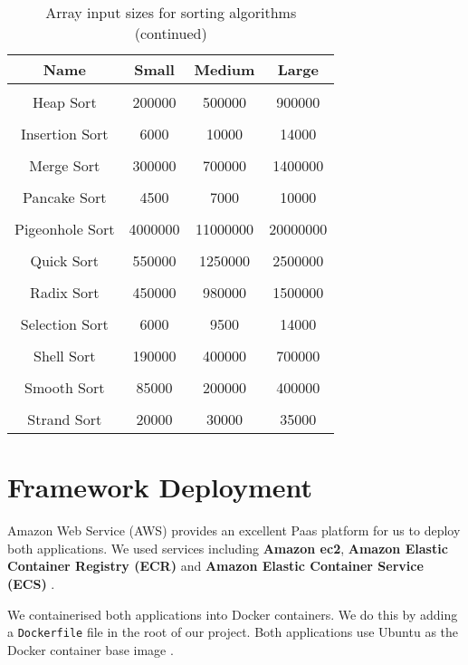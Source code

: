 \begin{table}[h!]
\centering
\begin{tabular}{||c c c c||} 
\hline
Name & Small & Medium & Large \\ [1ex] 
\hline\hline
 & & & \\
Heap Sort & 200000 & 500000 & 900000 \\ 
 & & & \\
Insertion Sort & 6000 & 10000 & 14000 \\ 
 & & & \\
Merge Sort & 300000 & 700000 & 1400000 \\
 & & & \\
Pancake Sort & 4500 & 7000 & 10000 \\
 & & & \\
Pigeonhole Sort & 4000000 & 11000000 & 20000000 \\ 
 & & & \\
Quick Sort & 550000 & 1250000 & 2500000 \\ 
 & & & \\
Radix Sort & 450000 & 980000 & 1500000 \\
 & & & \\
Selection Sort & 6000 & 9500 & 14000 \\ 
 & & & \\
Shell Sort & 190000 & 400000 & 700000 \\ 
 & & & \\
Smooth Sort & 85000 & 200000 & 400000 \\ 
 & & & \\
Strand Sort & 20000 & 30000 & 35000 \\ [1ex]
\hline
\end{tabular}
\caption{Array input sizes for sorting algorithms (continued)}
\label{table:time_complexity_2}
\end{table}
\bigskip

\bigskip
\section{Framework Deployment}

Amazon Web Service (AWS) provides an excellent Paas platform for us to deploy both applications. We used services including \textbf{Amazon ec2}, \textbf{Amazon Elastic Container Registry (ECR)} and \textbf{Amazon Elastic Container Service (ECS)} \cite{exp53} \cite{exp54}.

We containerised both applications into Docker containers. We do this by adding a \texttt{Dockerfile} file in the root of our project. Both applications use Ubuntu as the Docker container base image \cite{exp55}.

